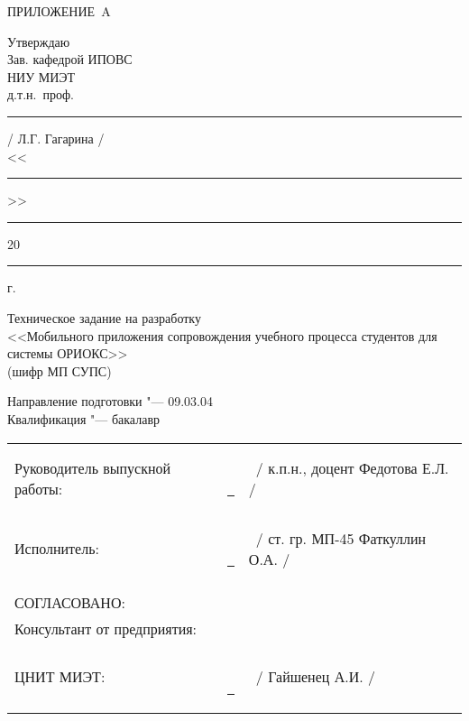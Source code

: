 \begin{flushright}
  ПРИЛОЖЕНИЕ~A

  Утверждаю \\
  Зав. кафедрой ИПОВС \\
  НИУ МИЭТ \\
  д.т.н.\ проф.\ \rule{3cm}{0.4pt} / Л.Г. Гагарина /\\
  <<\rule{0.8cm}{0.4pt}>> \rule{3cm}{0.4pt} 20\rule{0.8cm}{0.4pt}г. \\
\end{flushright}
\vfill
\begin{centering}
  Техническое задание на разработку\\
  <<Мобильного приложения сопровождения учебного процесса студентов для системы ОРИОКС>> \\
  (шифр МП СУПС) \\
\end{centering}
\vfill
\noindent
Направление подготовки "--- 09.03.04 \\
Квалификация "--- бакалавр
\vfill
\noindent
\begin{tabularx}{\textwidth}{l@{}X@{}l}
  Руководитель выпускной работы: & \ \rule{3.5cm}{0.4pt} & \ / к.п.н., доцент Федотова Е.Л. / \\[1ex]
  Исполнитель: & \ \rule{3.5cm}{0.4pt} & \ / ст. гр. МП-45 Фаткуллин О.А. / \\\\


  СОГЛАСОВАНО: & & \\
  Консультант от предприятия: & & \\
  ЦНИТ МИЭТ: & \ \rule{3.5cm}{0.4pt} & \ / Гайшенец А.И. / \\
\end{tabularx}

\vfill

\thispagestyle{empty}

\newpage
